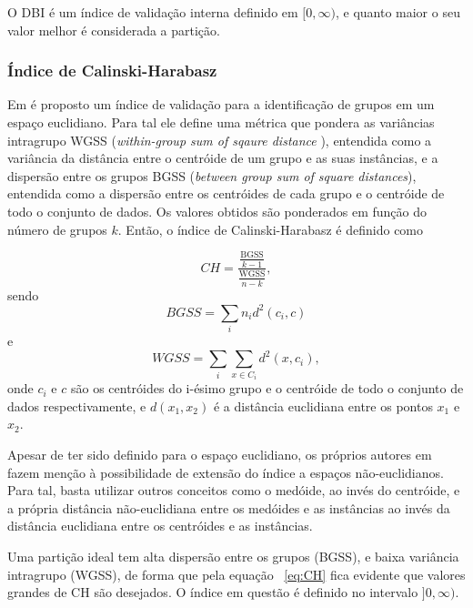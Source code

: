 O DBI é um índice de validação interna definido em $[0,\infty)$, e quanto maior o seu valor melhor é considerada a partição.


\subsubsection{Índice de Calinski-Harabasz}

Em \parencite{CH} é proposto um índice de validação para a identificação de grupos em um espaço euclidiano. Para tal ele define uma métrica que pondera as variâncias intragrupo WGSS (\emph{within-group sum of sqaure distance }), entendida como a variância da distância entre o centróide de um grupo e as suas instâncias, e a dispersão entre os grupos BGSS (\emph{between group sum of square distances}), entendida como a dispersão entre os centróides de cada grupo e o centróide de todo o conjunto de dados. Os valores obtidos são ponderados em função do número de grupos $k$. Então, o índice de Calinski-Harabasz é definido como

\begin{equation} \label{eq:CH}
CH = \frac{\frac{\text{BGSS}}{k-1}}{\frac{\text{WGSS}}{n-k}},
\end{equation}
sendo
\begin{equation}
BGSS=\sum_i{n_i d^2(c_i,c)}
\end{equation}
e
\begin{equation}
WGSS=\sum_i\sum_{x \in C_i} d^2(x,c_i),
\end{equation}
onde $c_i$ e $c$ são os centróides do i-ésimo grupo e o centróide de todo o conjunto de dados respectivamente, e $d(x_1,x_2)$ é a distância euclidiana entre os pontos $x_1$ e $x_2$.

Apesar de ter sido definido para o espaço euclidiano, os próprios autores em \parencite{CH} fazem menção à possibilidade de extensão do índice a espaços não-euclidianos. Para tal, basta utilizar outros conceitos como o medóide, ao invés do centróide, e a própria distância não-euclidiana entre os medóides e as instâncias ao invés da distância euclidiana entre os centróides e as instâncias.

Uma partição ideal tem alta dispersão entre os grupos (BGSS), e baixa variância intragrupo (WGSS), de forma que pela equação ~\ref{eq:CH} fica evidente que valores grandes de CH são desejados. O índice em questão é definido no intervalo $]0,\infty)$.



